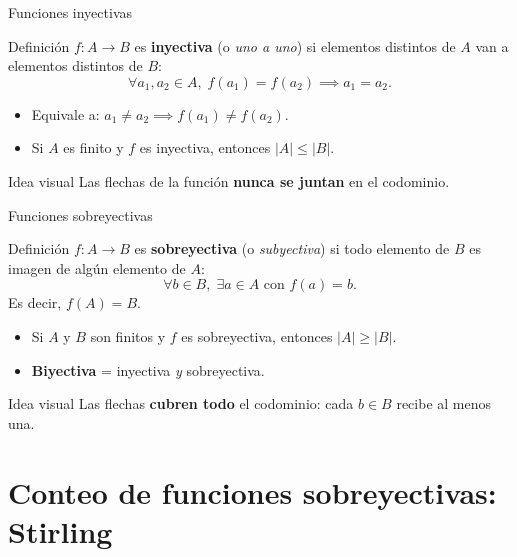 \documentclass[10pt,xcolor=dvipsnames]{beamer}
\begin{document}
\begin{frame}{Funciones inyectivas}
  \begin{block}{Definición}
    $f : A \to B$ es \textbf{inyectiva} (o \emph{uno a uno}) si elementos
    distintos de $A$ van a elementos distintos de $B$:
    \[
      \forall a_1, a_2 \in A,\; f(a_1) = f(a_2) \implies a_1 = a_2.
    \]
  \end{block}

  \begin{itemize}
    \item Equivale a: $a_1 \neq a_2 \implies f(a_1) \neq f(a_2)$.
    \item Si $A$ es finito y $f$ es inyectiva, entonces $|A| \leq |B|$.
  \end{itemize}

  \begin{exampleblock}{Idea visual}
    Las flechas de la función \textbf{nunca se juntan} en el codominio.
  \end{exampleblock}
\end{frame}

\begin{frame}{Funciones sobreyectivas}
  \begin{block}{Definición}
    $f : A \to B$ es \textbf{sobreyectiva} (o \emph{subyectiva}) si todo
    elemento de $B$ es imagen de algún elemento de $A$:
    \[
      \forall b \in B,\; \exists a \in A \text{ con } f(a) = b.
    \]
    Es decir, $f(A) = B$.
  \end{block}

  \begin{itemize}
    \item Si $A$ y $B$ son finitos y $f$ es sobreyectiva, entonces $|A| \geq |B|$.
    \item \textbf{Biyectiva} = inyectiva \emph{y} sobreyectiva.
  \end{itemize}

  \begin{alertblock}{Idea visual}
    Las flechas \textbf{cubren todo} el codominio: cada $b \in B$ recibe al menos una.
  \end{alertblock}
\end{frame}


\section{Conteo de funciones sobreyectivas: Stirling}
\end{document}
